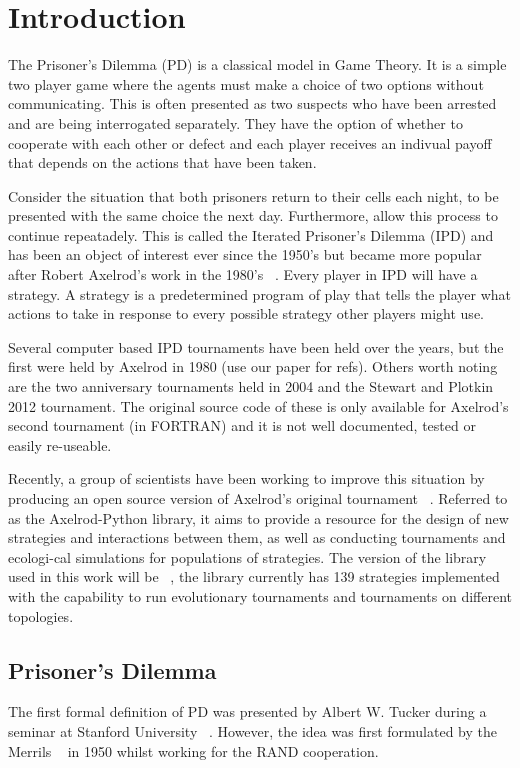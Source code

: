 
\chapter{Introduction}\label{cha:introduction}

The Prisoner's Dilemma (PD) is a classical model in Game Theory.
It is a simple two player game where the agents must make a choice of two options without communicating.
This is often presented as two suspects who have been arrested and are being interrogated separately.
They have the option of whether to cooperate with each other or defect and each player receives an indivual payoff that depends on the actions that have been taken.

Consider the situation that both prisoners return to their cells each night, to be presented with the same choice the next day.
Furthermore, allow this process to continue repeatadely.
This is called the Iterated Prisoner's Dilemma (IPD) and has been an object of interest ever since the 1950's but became more popular after Robert Axelrod's work in the 1980's ~\cite{Axelrod2016}.
Every player in IPD will have a strategy.
A strategy is a predetermined program of play that tells the player what actions to take in response to every possible strategy other players might use.

Several computer based IPD tournaments have been held over the years, but the first were held by Axelrod in 1980 (use our paper for refs). %
Others worth noting are the two anniversary tournaments  held in 2004 and the Stewart and Plotkin 2012 tournament.
The original source code of these is only available for Axelrod's second tournament (in FORTRAN) and it is not well documented, tested or easily re-useable.

Recently, a group of scientists have been working to improve this situation by producing an open source version of Axelrod's original tournament ~\cite{Knight2016}.
Referred to as the Axelrod-Python library, it aims to provide a resource for the design of new strategies and interactions between them, as well as conducting tournaments and ecologi-cal simulations for populations of strategies.
The version of the library used in this work will be ~\cite{axelrodproject}, the library currently has 139 strategies implemented with the capability to run evolutionary tournaments and tournaments on different topologies.

\section{Prisoner's Dilemma}
The first formal definition of PD was presented by Albert W. Tucker during a seminar at Stanford University ~\cite{Gass2005}.
However, the idea was first formulated by the Merrils ~\cite{Flood1958} in 1950 whilst working for the RAND cooperation.

